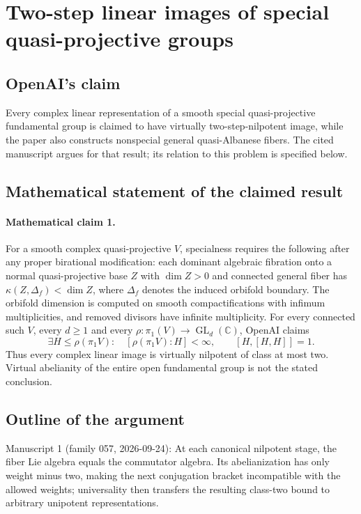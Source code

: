 \documentclass[11pt]{article}
\begin{document}
\section*{Two-step linear images of special quasi-projective groups}

\subsection{OpenAI's claim}
Every complex linear representation of a smooth special quasi-projective fundamental group is claimed to have virtually two-step-nilpotent image, while the paper also constructs nonspecial general quasi-Albanese fibers. The cited manuscript argues for that result; its relation to this problem is specified below.

\subsection{Mathematical statement of the claimed result}
\paragraph{Mathematical claim 1.} For a smooth complex quasi-projective $V$, specialness requires the following after any proper birational modification: each dominant algebraic fibration onto a normal quasi-projective base $Z$ with $\dim Z>0$ and connected general fiber has $\kappa(Z,\Delta_f)<\dim Z$, where $\Delta_f$ denotes the induced orbifold boundary. The orbifold dimension is computed on smooth compactifications with infimum multiplicities, and removed divisors have infinite multiplicity. For every connected such $V$, every $d\ge1$ and every $\rho:\pi_1(V)\to\operatorname{GL}_d(\mathbb C)$, OpenAI claims
\[
\exists H\le\rho(\pi_1V):\quad[\rho(\pi_1V):H]<\infty,\qquad[H,[H,H]]=1.
\]
Thus every complex linear image is virtually nilpotent of class at most two. Virtual abelianity of the entire open fundamental group is not the stated conclusion.

\subsection{Outline of the argument}
Manuscript 1 (family 057, 2026-09-24): At each canonical nilpotent stage, the fiber Lie algebra equals the commutator algebra. Its abelianization has only weight minus two, making the next conjugation bracket incompatible with the allowed weights; universality then transfers the resulting class-two bound to arbitrary unipotent representations.
\end{document}
